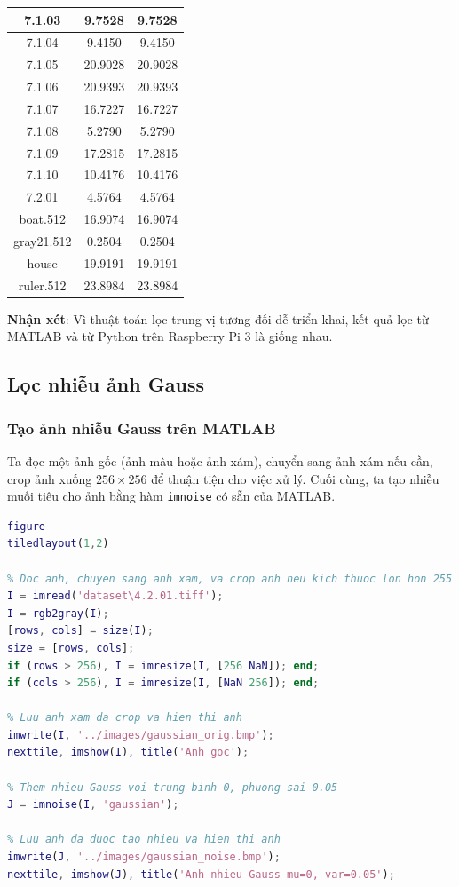 \begin{table}[H]
\begin{tabular}{|c|c|c|}
7.1.03 & 9.7528 & 9.7528 \\ \hline
7.1.04 & 9.4150 & 9.4150 \\ \hline
7.1.05 & 20.9028 & 20.9028 \\ \hline
7.1.06 & 20.9393 & 20.9393 \\ \hline
7.1.07 & 16.7227 & 16.7227 \\ \hline
7.1.08 & 5.2790 & 5.2790 \\ \hline
7.1.09 & 17.2815 & 17.2815 \\ \hline
7.1.10 & 10.4176 & 10.4176 \\ \hline
7.2.01 & 4.5764 & 4.5764 \\ \hline
boat.512 & 16.9074 & 16.9074 \\ \hline
gray21.512 & 0.2504 & 0.2504 \\ \hline
house & 19.9191 & 19.9191 \\ \hline
ruler.512 & 23.8984 & 23.8984 \\ \hline
\end{tabular}
\end{table}

\textbf{Nhận xét}: Vì thuật toán lọc trung vị tương đối dễ triển khai, 
kết quả lọc từ MATLAB và từ Python trên Raspberry Pi 3 là giống nhau.

\subsection{Lọc nhiễu ảnh Gauss}

\subsubsection{Tạo ảnh nhiễu Gauss trên MATLAB}

Ta đọc một ảnh gốc (ảnh màu hoặc ảnh xám), chuyển sang ảnh xám nếu cần, crop ảnh xuống $256 \times 256$ để thuận tiện cho việc xử lý. Cuối cùng, ta tạo nhiễu muối tiêu cho ảnh bằng hàm \texttt{imnoise} có sẵn của MATLAB.

\begin{lstlisting}[language=MATLAB]
figure
tiledlayout(1,2)

% Doc anh, chuyen sang anh xam, va crop anh neu kich thuoc lon hon 255
I = imread('dataset\4.2.01.tiff');
I = rgb2gray(I);
[rows, cols] = size(I);
size = [rows, cols];
if (rows > 256), I = imresize(I, [256 NaN]); end;
if (cols > 256), I = imresize(I, [NaN 256]); end;

% Luu anh xam da crop va hien thi anh
imwrite(I, '../images/gaussian_orig.bmp');
nexttile, imshow(I), title('Anh goc');

% Them nhieu Gauss voi trung binh 0, phuong sai 0.05
J = imnoise(I, 'gaussian');

% Luu anh da duoc tao nhieu va hien thi anh
imwrite(J, '../images/gaussian_noise.bmp');
nexttile, imshow(J), title('Anh nhieu Gauss mu=0, var=0.05');
\end{lstlisting}

